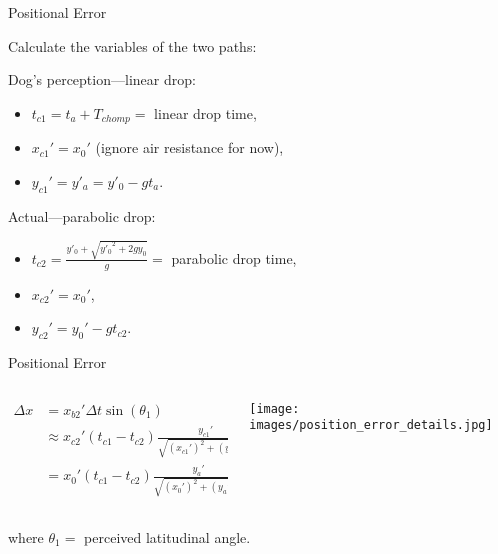 \documentclass[compress,12pt,mp]{beamer}
\begin{document}
\begin{frame}[t]{Positional Error}

Calculate the variables of the two paths: 

    Dog's perception---linear drop:
    \begin{itemize}

    \item $t_{c1}=t_{a}+T_{chomp}=$ linear drop time,
    \item $x_{c1}'=x_0'$ (ignore air resistance for now),
    \item$y_{c1}'=y'_{a}=y'_0-gt_{a}$.
    \end{itemize}

    Actual---parabolic drop:
    \begin{itemize}
    \item $t_{c2}=\frac{y'_0+\sqrt{{y'_0}^2+2gy_0}}{g}=$ parabolic drop time,
    \item $x_{c2}'=x_0'$,
    \item$y_{c2}'=y_0'-gt_{c2}$.
\end{itemize}

\end{frame}
\begin{frame}[t]{Positional Error}

\begin{columns}
    \begin{column}{0.45\linewidth}
        \begin{align*}
            \Delta x&=x_{b2}'\Delta t\sin(\theta_1)\\
            &\approx x_{c2}'(t_{c1}-t_{c2})\frac{y_{c1}'}{\sqrt{(x_{c1}')^2+(y_{c1}')^2}}\\
            &=x_{0}'(t_{c1}-t_{c2})\frac{y_{a}'}{\sqrt{(x_{0}')^2+(y_{a}')^2}},
        \end{align*}
    \end{column}
    \begin{column}{0.55\linewidth}
        \texttt{[image: images/position\_error\_details.jpg]}
    \end{column}
\end{columns}
        where $\theta_1=$ perceived latitudinal angle. 

\end{frame}
\end{document}
